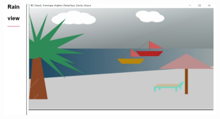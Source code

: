 \documentclass{article}
\begin{document}
\begin{center}
\begin{figure}
    \includegraphics[width=5in]{rain view.jpg}\\
      
   \end{figure} 
\end{center}
\end{document}
